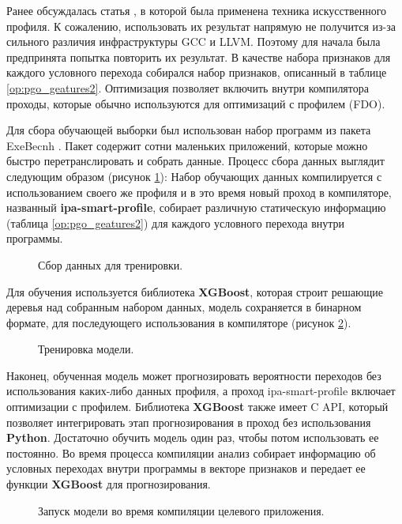 Ранее обсуждалась статья  \cite{rotem2021profile}, в которой была применена техника искусственного профиля. К сожалению, использовать их результат напрямую не получится из-за сильного различия инфраструктуры  GCC и LLVM. Поэтому для начала была предпринята попытка повторить их результат. В качестве набора признаков для каждого условного перехода собирался набор признаков, описанный в таблице \ref{op:pgo_geatures2}. Оптимизация позволяет включить внутри компилятора проходы, которые обычно используются для оптимизаций с профилем (FDO).

Для сбора обучающей выборки был использован набор программ из пакета ExeBecnh \cite{armengol2022exebench}. Пакет содержит сотни маленьких приложений, которые можно быстро перетранслировать и собрать данные. Процесс сбора данных выглядит следующим образом (рисунок \ref{op:mlpgo1}): Набор обучающих данных компилируется  с использованием своего же профиля и в это время новый проход в компиляторе, названный \textbf{ipa-smart-profile}, собирает различную статическую информацию (таблица \ref{op:pgo_geatures2}) для каждого условного перехода внутри программы. 

\begin{figure}[htbp]
	\centering
	
	\caption{Сбор данных для тренировки.}
	\label{op:mlpgo1}
\end{figure}

Для обучения используется библиотека \textbf{XGBoost}, которая строит решающие деревья над собранным набором данных, модель сохраняется в бинарном формате, для последующего использования в компиляторе (рисунок \ref{op:mlpgo2}).

\begin{figure}[htbp]
	\centering
	
	\caption{Тренировка модели.}
	\label{op:mlpgo2}
\end{figure}
Наконец, обученная модель может прогнозировать вероятности  переходов  без использования каких-либо данных профиля, а проход ipa-smart-profile включает оптимизации с профилем. Библиотека \textbf{XGBoost} также имеет C API, который позволяет интегрировать этап прогнозирования в проход без использования \textbf{Python}. Достаточно обучить модель один раз, чтобы потом использовать ее постоянно. Во время процесса компиляции анализ собирает информацию об условных переходах  внутри программы в векторе признаков и передает ее функции \textbf{XGBoost} для прогнозирования.
\begin{figure}[htbp]
	\centering
	
	\caption{Запуск модели во время компиляции целевого приложения.}
	\label{op:mlpgo3}
\end{figure}


